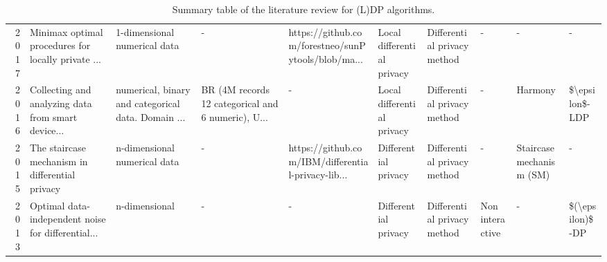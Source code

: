 \begin{landscape}
\begin{table}[ht]
\begin{adjustbox}{width=1.8\textwidth}
\begin{tabular}{rlllllllll}
        2017                    & Minimax optimal procedures for locally private ... & 1-dimensional numerical data                       & -                                                  & https://github.com/forestneo/sunPytools/blob/ma... & Local differential privacy & Differential privacy method & -               & -                          & -                               \\
        2016                    & Collecting and analyzing data from smart device... & numerical, binary and categorical data. Domain ... & BR (4M records 12 categorical and 6 numeric), U... & -                                                  & Local differential privacy & Differential privacy method & -               & Harmony                    & \$\textbackslash epsilon\$-LDP  \\
        2015                    & The staircase mechanism in differential privacy    & n-dimensional numerical data                       & -                                                  & https://github.com/IBM/differential-privacy-lib... & Differential privacy       & Differential privacy method & -               & Staircase mechanism (SM)   & -                               \\
        2013                    & Optimal data-independent noise for differential... & n-dimensional                                      & -                                                  & -                                                  & Differential privacy       & Differential privacy method & Non interactive & -                          & \$(\textbackslash epsilon)\$-DP \\
        \bottomrule
      \end{tabular}
    \end{adjustbox}
    \caption{Summary table of the literature review for (L)DP algorithms.}
  \end{table}
\end{landscape}
